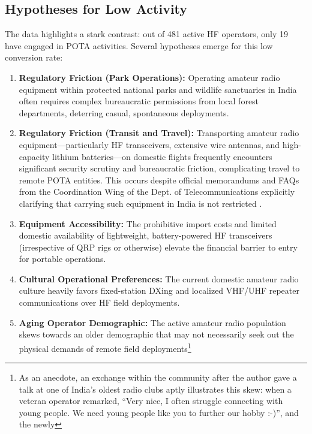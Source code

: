 \documentclass[conference]{IEEEtran}
\begin{document}
\subsection{Hypotheses for Low Activity}
\label{subsection:hypotheses}
The data highlights a stark contrast: out of 481 active HF operators,
only 19 have engaged in POTA activities. Several hypotheses emerge for
this low conversion rate:
\begin{enumerate}
    \item \textbf{Regulatory Friction (Park Operations):} Operating
      amateur radio equipment within protected national parks and
      wildlife sanctuaries in India often requires complex
      bureaucratic permissions from local forest departments,
      deterring casual, spontaneous deployments.
    \item \textbf{Regulatory Friction (Transit and Travel):}
      Transporting amateur radio equipment—particularly HF
      transceivers, extensive wire antennas, and high-capacity lithium
      batteries—on domestic flights frequently encounters significant
      security scrutiny and bureaucratic friction, complicating travel
      to remote POTA entities. This occurs despite official
      memorandums and FAQs from the Coordination Wing of the Dept. of
      Telecommunications explicitly clarifying that carrying such
      equipment in India is not restricted \cite{b14, b15}.
    \item \textbf{Equipment Accessibility:} The prohibitive import
      costs and limited domestic availability of lightweight,
      battery-powered HF transceivers (irrespective of QRP rigs or
      otherwise) elevate the financial barrier to entry for portable
      operations.
    \item \textbf{Cultural Operational Preferences:} The current
      domestic amateur radio culture heavily favors fixed-station
      DXing and localized VHF/UHF repeater communications over HF
      field deployments.
    \item \textbf{Aging Operator Demographic:} The active amateur
      radio population skews towards an older demographic that may not
      necessarily seek out the physical demands of remote field
      deployments\footnote{As an anecdote, an exchange within the community after
      the author gave a talk at one of India's oldest radio clubs aptly
      illustrates this skew: when a veteran operator remarked, ``Very
      nice, I often struggle connecting with young people. We need
      young people like you to further our hobby :-)'', and the newly
}
\end{enumerate}
\end{document}
